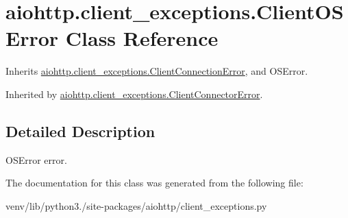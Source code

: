 \hypertarget{classaiohttp_1_1client__exceptions_1_1_client_o_s_error}{}\section{aiohttp.\+client\+\_\+exceptions.\+Client\+O\+S\+Error Class Reference}
\label{classaiohttp_1_1client__exceptions_1_1_client_o_s_error}


Inherits \hyperlink{classaiohttp_1_1client__exceptions_1_1_client_connection_error}{aiohttp.\+client\+\_\+exceptions.\+Client\+Connection\+Error}, and O\+S\+Error.



Inherited by \hyperlink{classaiohttp_1_1client__exceptions_1_1_client_connector_error}{aiohttp.\+client\+\_\+exceptions.\+Client\+Connector\+Error}.



\subsection{Detailed Description}
\begin{DoxyVerb}OSError error.\end{DoxyVerb}
 

The documentation for this class was generated from the following file\+:\begin{DoxyCompactItemize}
\item 
venv/lib/python3./site-\/packages/aiohttp/client\+\_\+exceptions.\+py\end{DoxyCompactItemize}
